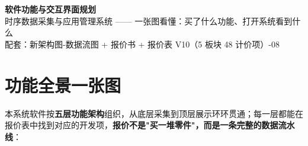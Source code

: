 \documentclass[11pt,a4paper]{ctexart}
\begin{document}
\begin{center}
{\Huge\bfseries 软件功能与交互界面规划}\\[6pt]
{\large 时序数据采集与应用管理系统 —— 一张图看懂：买了什么功能、打开系统看到什么}\\[6pt]
{\small 配套：新架构图-数据流图 + 报价书 + 报价表 V10（5 板块 48 计价项）-08}
\end{center}

\vspace{0.5em}
\noindent\hrulefill
\vspace{0.5em}

\section{功能全景一张图}

本系统软件按\textbf{五层功能架构}组织，从底层采集到顶层展示环环贯通；每一层都能在报价表中找到对应的开发项，\textbf{报价不是"买一堆零件"，而是一条完整的数据流水线}：
\end{document}

